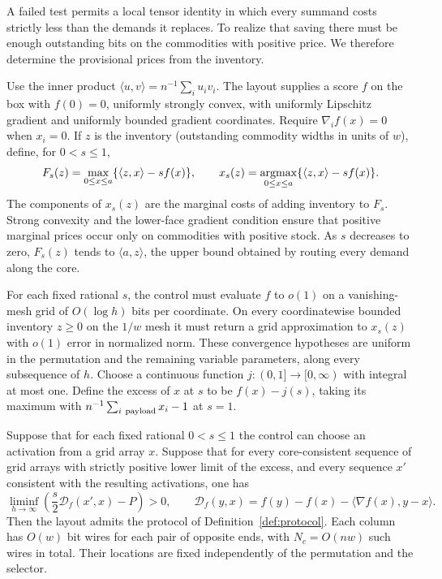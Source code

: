 A failed test permits a local tensor identity in which every summand
costs strictly less than the demands it replaces. To realize that saving
there must be enough outstanding bits on the commodities with positive
price. We therefore determine the provisional prices from the inventory.

Use the inner product $\langle u,v\rangle=n^{-1}\sum_i u_iv_i$.
The layout supplies a score $f$ on the box with $f(0)=0$, uniformly
strongly convex, with uniformly Lipschitz gradient and uniformly bounded
gradient coordinates. Require $\nabla_i f(x)=0$ when $x_i=0$.
If $z$ is the inventory (outstanding commodity widths in units of $w$), define, for $0<s\le1$,
\[
 F_s(z)=\max_{0\le x\le a}\{\langle z,x\rangle-sf(x)\},\qquad
 x_s(z)=\mathop{\rm argmax}_{0\le x\le a}
          \{\langle z,x\rangle-sf(x)\}.
\]
The components of $x_s(z)$ are the marginal costs of adding inventory
to $F_s$. Strong convexity and the lower-face gradient condition ensure that
positive marginal prices occur only on commodities with positive stock.
As $s$ decreases to zero, $F_s(z)$ tends to $\langle a,z\rangle$,
the upper bound obtained by routing every demand along the core.

For each fixed rational $s$, the control must evaluate $f$ to $o(1)$
on a vanishing-mesh grid of $O(\log h)$ bits per coordinate. On every
coordinatewise bounded inventory $z\ge0$ on the $1/w$ mesh it must
return a grid approximation to $x_s(z)$ with $o(1)$ error in normalized
norm. These convergence hypotheses are uniform in the permutation and the
remaining variable parameters, along every subsequence of $h$. Choose a
continuous function $j:(0,1]\to[0,\infty)$ with integral at most one. Define the excess of $x$ at $s$ to be $f(x)-j(s)$, taking its
maximum with $n^{-1}\sum_{i\ {\rm payload}}x_i-1$ at $s=1$.

\begin{proposition}
\label{prop:adaptive-probing}
Suppose that for each fixed rational $0<s\le1$ the control can choose
an activation from a grid array $x$. Suppose that for every
core-consistent sequence of grid arrays with strictly positive lower
limit of the excess, and every sequence $x'$ consistent with the
resulting activations, one has
\begin{equation}\label{eq:protocol-activation}
 \liminf_{h\to\infty}
 \left(\frac{s}{2}\mathcal D_f(x',x)-P\right)>0,\qquad
 \mathcal D_f(y,x)=f(y)-f(x)-\langle\nabla f(x),y-x\rangle .
\end{equation}
Then the layout admits the protocol of Definition~\ref{def:protocol}.
Each column has $O(w)$ bit wires for each pair of opposite ends,
with $N_c=O(nw)$ such wires in total. Their locations are fixed
independently of the permutation and the selector.
\end{proposition}

